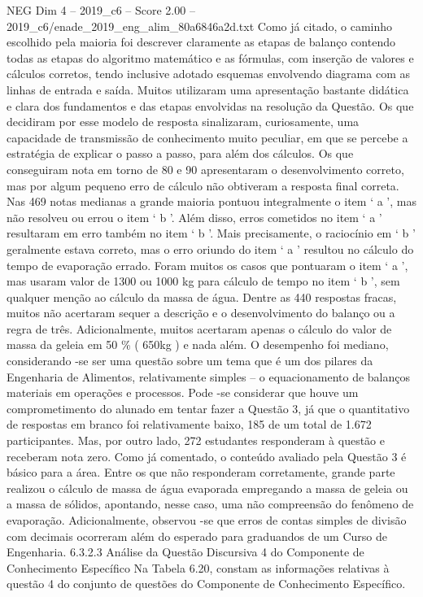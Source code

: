 \begin{textsample}{NEG Dim 4 – 2019\_c6 – Score 2.00 – 2019\_c6/enade\_2019\_eng\_alim\_80a6846a2d.txt}
Como já citado, o caminho escolhido pela maioria foi descrever claramente as etapas de balanço contendo todas as etapas do algoritmo matemático e as fórmulas, com inserção de valores e cálculos corretos, tendo inclusive adotado esquemas envolvendo diagrama com as linhas de entrada e saída.
Muitos utilizaram uma apresentação bastante didática e clara dos fundamentos e das etapas envolvidas na resolução da Questão.
Os que decidiram por esse modelo de resposta sinalizaram, curiosamente, uma capacidade de transmissão de conhecimento muito peculiar, em que se percebe a estratégia de explicar o passo a passo, para além dos cálculos.
Os que conseguiram nota em torno de 80 e 90 apresentaram o desenvolvimento correto, mas por algum pequeno erro de cálculo não obtiveram a resposta final correta.
Nas 469 notas medianas a grande maioria pontuou integralmente o item ‘ a ’, mas não resolveu ou errou o item ‘ b ’.
Além disso, erros cometidos no item ‘ a ’ resultaram em erro também no item ‘ b ’.
Mais precisamente, o raciocínio em ‘ b ’ geralmente estava correto, mas o erro oriundo do item ‘ a ’ resultou no cálculo do tempo de evaporação errado.
Foram muitos os casos que pontuaram o item ‘ a ’, mas usaram valor de 1300 ou 1000 kg para cálculo de tempo no item ‘ b ’, sem qualquer menção ao cálculo da massa de água.
Dentre as 440 respostas fracas, muitos não acertaram sequer a descrição e o desenvolvimento do balanço ou a regra de três.
Adicionalmente, muitos acertaram apenas o cálculo do valor de massa da geleia em 50 \% ( 650kg ) e nada além.
O desempenho foi mediano, considerando -se ser uma questão sobre um tema que é um dos pilares da Engenharia de Alimentos, relativamente simples – o equacionamento de balanços materiais em operações e processos.
Pode -se considerar que houve um comprometimento do alunado em tentar fazer a Questão 3, já que o quantitativo de respostas em branco foi relativamente baixo, 185 de um total de 1.672 participantes.
Mas, por outro lado, 272 estudantes responderam à questão e receberam nota zero.
Como já comentado, o conteúdo avaliado pela Questão 3 é básico para a área.
Entre os que não responderam corretamente, grande parte realizou o cálculo de massa de água evaporada empregando a massa de geleia ou a massa de sólidos, apontando, nesse caso, uma não compreensão do fenômeno de evaporação.
Adicionalmente, observou -se que erros de contas simples de divisão com decimais ocorreram além do esperado para graduandos de um Curso de Engenharia. 6.3.2.3 Análise da Questão Discursiva 4 do Componente de Conhecimento Específico Na Tabela 6.20, constam as informações relativas à questão 4 do conjunto de questões do Componente de Conhecimento Específico.

\end{textsample}
